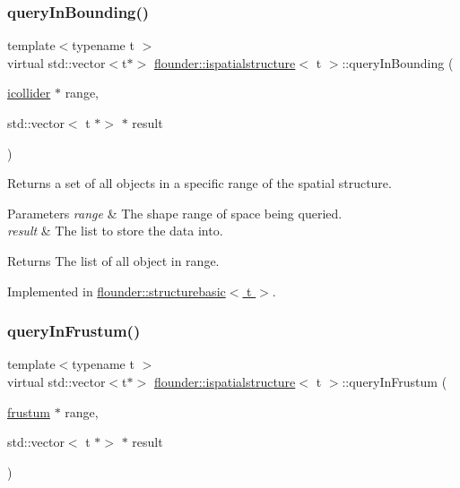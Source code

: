 \subsubsection{\texorpdfstring{query\+In\+Bounding()}{queryInBounding()}}
{\footnotesize\ttfamily template$<$typename t $>$ \\
virtual std\+::vector$<$t$\ast$$>$ \hyperlink{classflounder_1_1ispatialstructure}{flounder\+::ispatialstructure}$<$ t $>$\+::query\+In\+Bounding (\begin{DoxyParamCaption}\item[{\hyperlink{classflounder_1_1icollider}{icollider} $\ast$}]{range,  }\item[{std\+::vector$<$ t $\ast$$>$ $\ast$}]{result }\end{DoxyParamCaption})\hspace{0.3cm}{\ttfamily [pure virtual]}}



Returns a set of all objects in a specific range of the spatial structure. 


\begin{DoxyParams}{Parameters}
{\em range} & The shape range of space being queried. \\
\hline
{\em result} & The list to store the data into. \\
\hline
\end{DoxyParams}
\begin{DoxyReturn}{Returns}
The list of all object in range. 
\end{DoxyReturn}


Implemented in \hyperlink{classflounder_1_1structurebasic_a8b185614cd8ee80a3ca14cc4f368e055}{flounder\+::structurebasic$<$ t $>$}.

\mbox{\label{classflounder_1_1ispatialstructure_a05119caef7fd1f1677bff025f782506e}} 
\subsubsection{\texorpdfstring{query\+In\+Frustum()}{queryInFrustum()}}
{\footnotesize\ttfamily template$<$typename t $>$ \\
virtual std\+::vector$<$t$\ast$$>$ \hyperlink{classflounder_1_1ispatialstructure}{flounder\+::ispatialstructure}$<$ t $>$\+::query\+In\+Frustum (\begin{DoxyParamCaption}\item[{\hyperlink{classflounder_1_1frustum}{frustum} $\ast$}]{range,  }\item[{std\+::vector$<$ t $\ast$$>$ $\ast$}]{result }\end{DoxyParamCaption})\hspace{0.3cm}{\ttfamily [pure virtual]}}



